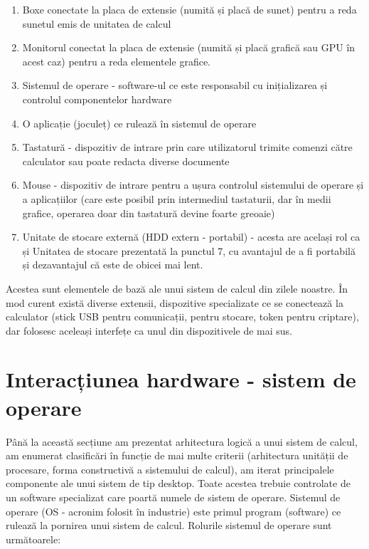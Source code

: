 \begin{enumerate}
	\item Boxe conectate la placa de extensie (numită și placă de sunet)
		pentru a reda sunetul emis de unitatea de calcul
	\item Monitorul conectat la placa de extensie (numită și placă grafică
		sau GPU  în acest caz)
		pentru a reda elementele grafice.
	\item Sistemul de operare - software-ul ce este responsabil cu
		inițializarea și controlul componentelor hardware
	\item O aplicație (joculeț) ce rulează în sistemul de operare
	\item Tastatură - dispozitiv de intrare prin care utilizatorul trimite
		comenzi către calculator sau poate redacta diverse documente
	\item Mouse - dispozitiv de intrare pentru a ușura controlul sistemului
		de operare și a aplicațiilor (care este posibil prin intermediul
		tastaturii, dar în medii grafice, operarea doar din tastatură
		devine foarte greoaie)
	\item Unitate de stocare externă (HDD extern - portabil) - acesta are
		același rol ca și Unitatea de stocare prezentată la punctul 7,
		cu avantajul de a fi portabilă și dezavantajul că este de obicei
		mai lent.

\end{enumerate}

Acestea sunt elementele de bază ale unui sistem de calcul din zilele noastre. În
mod curent există diverse extensii, dispozitive specializate ce se conectează la
calculator (stick USB pentru comunicații, pentru stocare, token pentru
criptare), dar folosesc aceleași interfețe ca unul din dispozitivele de mai sus.

\section{Interacțiunea hardware - sistem de operare}
\label{sec:hardware-interact}

Până la această secțiune am prezentat arhitectura logică a unui sistem de
calcul, am enumerat clasificări în funcție de mai multe criterii (arhitectura
unității de procesare, forma constructivă a sistemului de calcul), am iterat
principalele componente ale unui sistem de tip desktop. Toate acestea trebuie
controlate de un software specializat care poartă numele de sistem de operare.
Sistemul de operare (OS - acronim folosit în industrie) este primul program
(software) ce rulează la pornirea unui sistem de calcul. Rolurile sistemul de
operare sunt următoarele:

